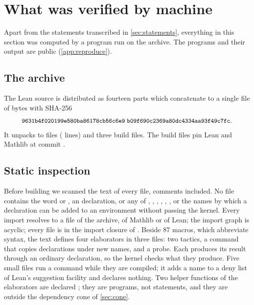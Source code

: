 \section{What was verified by machine}\label{sec:verification}

Apart from the statements transcribed in \cref{sec:statements}, everything in this section was
computed by a program run on the archive. The programs and their output are public
(\cref{app:reproduce}).

\subsection{The archive}
The Lean source is distributed as fourteen parts which concatenate to a single file
 of \archivebytes{} bytes with SHA-256
\[
\text{\small\ttfamily 9631b4f020199e580ba86178cb56c6e9}\;\text{\small\ttfamily b09f690c2369a80dc4334aa93f49c7fc}.
\]
It unpacks to \filecount{}  files (\linecount{} lines) and three build files. The
build files pin Lean \leanversion{} and Mathlib at commit
.

\subsection{Static inspection}
Before building we scanned the text of every file, comments included. No file contains the
word  or , an  declaration, or any of
, , , , ,
, or the names by which a declaration can be added to an environment without
passing the kernel. Every import resolves to a file of the archive, of Mathlib or of Lean; the
import graph is acyclic; every file is in the import closure of . Beside 87
macros, which abbreviate syntax, the text defines four elaborators in three files: two
tactics, a command that copies declarations under new names, and a probe. Each produces its
result through an ordinary declaration, so the kernel checks what they produce. Five small
files run a command while they are compiled; it adds a name to a deny list of Lean's
suggestion facility and declares nothing. Two helper functions of the elaborators are declared
; they are programs, not statements, and they are outside the dependency cone of
\cref{sec:cone}.

